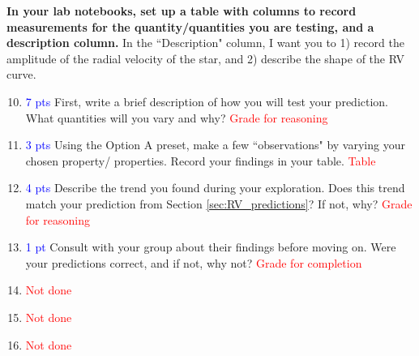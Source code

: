 \documentclass[11pt]{article}
\begin{document}
\medskip \noindent
\textbf{In your lab notebooks, set up a table with columns to record measurements for the quantity/quantities you are testing, and a description column.}  In the ``Description" column, I want you to 1) record the amplitude of the radial velocity of the star, and 2) describe the shape of the RV curve.

\begin{enumerate}
\setcounter{enumi}{9}
    \item \textcolor{blue}{7 pts} First, write a brief description of how you will test your prediction.  What quantities will you vary and why? \textcolor{red}{Grade for reasoning}
    \item \textcolor{blue}{3 pts} Using the Option A preset, make a few ``observations" by varying your chosen property/ properties.  Record your findings in your table. \textcolor{red}{Table}
    \item \textcolor{blue}{4 pts} Describe the trend you found during your exploration. Does this trend match your prediction from Section \ref{sec:RV_predictions}?  If not, why? \textcolor{red}{Grade for reasoning}

    \item \textcolor{blue}{1 pt} Consult with your group about their findings before moving on.  Were your predictions correct, and if not, why not? \textcolor{red}{Grade for completion}
    
    \item \textcolor{red}{Not done}
    
    \item \textcolor{red}{Not done}
    
    \item \textcolor{red}{Not done}
\end{enumerate}
\end{document}
